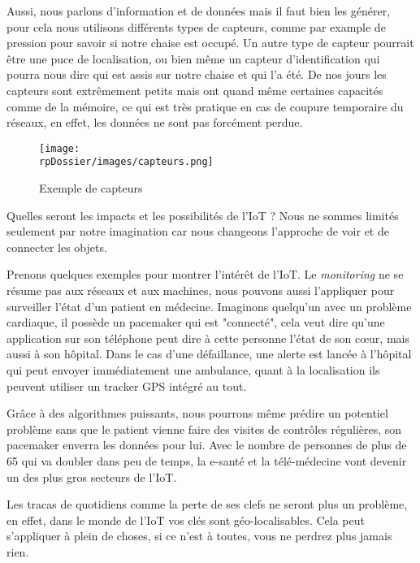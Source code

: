 Aussi, nous parlons d'information et de données mais il faut bien les générer, pour cela nous utilisons différents types de capteurs, comme par example de pression pour savoir si notre chaise est occupé. Un autre type de capteur pourrait être une puce de localisation, ou bien même un capteur d'identification qui pourra nous dire qui est assis sur notre chaise et qui l'a été. De nos jours les capteurs sont extrêmement petits mais ont quand même certaines capacités comme de la mémoire, ce qui est très pratique en cas de coupure temporaire du réseaux, en effet, les données ne sont pas forcément perdue.

\begin{figure}[H]
\begin{center}
\texttt{[image: \\rpDossier/images/capteurs.png]}
\end{center}
\caption{Exemple de capteurs}
\label{conflinphone}
\end{figure}

Quelles seront les impacts et les possibilités de l'IoT ? Nous ne sommes limités seulement par notre imagination car nous changeons l'approche de voir et de connecter les objets.


Prenons quelques exemples pour montrer l'intérêt de l'IoT. Le \textit{monitoring} ne se résume pas aux réseaux et aux machines, nous pouvons aussi l'appliquer pour surveiller l'état d'un patient en médecine. Imaginons quelqu'un avec un problème cardiaque, il possède un pacemaker qui est "connecté", cela veut dire qu'une application sur son téléphone peut dire à cette personne l'état de son cœur, mais aussi à son hôpital. Dans le cas d'une défaillance, une alerte est lancée à l'hôpital qui peut envoyer immédiatement une ambulance, quant à la localisation ils peuvent utiliser un tracker GPS intégré au tout.

Grâce à des algorithmes puissants, nous pourrons même prédire un potentiel problème sans que le patient vienne faire des visites de contrôles régulières, son pacemaker enverra les données pour lui. Avec le nombre de personnes de plus de 65 qui va doubler dans peu de temps, la e-santé et la télé-médecine vont devenir un des plus gros secteurs de l'IoT. 


Les tracas de quotidiens comme la perte de ses clefs ne seront plus un problème, en effet, dans le monde de l'IoT vos clés sont géo-localisables. Cela peut s'appliquer à plein de choses, si ce n'est à toutes, vous ne perdrez plus jamais rien.

